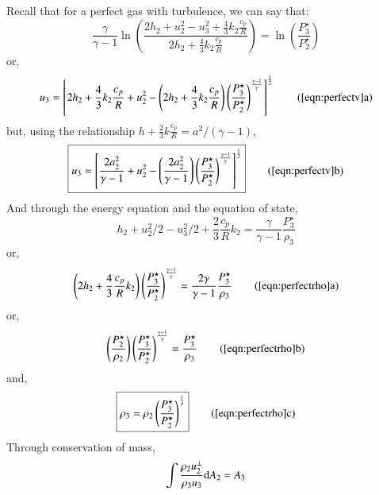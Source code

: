 \documentclass{warpdoc}
\numberwithin{equation}{section}
\newcommand{\Cp}{{c_{p}}}
\newcommand{\mfd}{\displaystyle}
\newcommand{\ordi}{{\rm d}}
\newcommand\frameeqn[1]{\fbox{$#1$}}
\begin{document}
Recall that for a perfect gas with turbulence, we can say that:
%
\begin{equation}
\frac{\gamma}{\gamma-1} \ln \left( \frac{2 h_2+u_2^2-u_3^2+\frac{4}{3}k_2 \frac{\Cp}{R}}
                                 {2 h_2+\frac{4}{3}k_2 \frac{\Cp}{R}} \right)
  =  \ln \left(\frac{P_3^\star}{P_2^\star}\right)
\label{eqn:perfectv}
\end{equation}
%
or,
%
\begin{equation}
   \mfd u_3
  = \left[ 2 h_2+\frac{4}{3}k_2 \frac{\Cp}{R}+u_2^2
   -\left( 2 h_2 +\frac{4}{3}k_2 \frac{\Cp}{R} \right)
      \left(\frac{P_3^\star}{P_2^\star}\right)^\frac{\gamma-1}{\gamma}
    \right]^\frac{1}{2}
  \tag{\ref{eqn:perfectv}a}
  \label{eqn:perfectv-2}
\end{equation}
%
but, using the relationship $h+\frac{2}{3}k\frac{\Cp}{R}=a^2/(\gamma-1)$,
%
\begin{equation}
 \frameeqn{
   \mfd u_3
  = \left[ \frac{2 a_2^2}{\gamma-1}+u_2^2
   -\left( \frac{2 a_2^2}{\gamma-1} \right)
      \left(\frac{P_3^\star}{P_2^\star}\right)^\frac{\gamma-1}{\gamma}
    \right]^\frac{1}{2}
 }
  \tag{\ref{eqn:perfectv}b}
  \label{eqn:perfectv-final}
\end{equation}
%
And through the energy equation and the equation of state,
%
\begin{equation}
   h_2+u_2^2/2-u_3^2/2 +\frac{2}{3}\frac{\Cp}{R} k_2
 = \frac{\gamma}{\gamma-1} \frac{P_3^\star}{\rho_3}
  \label{eqn:perfectrho}
\end{equation}
%
or,
%
\begin{equation}
   \left( 2 h_2 +\frac{4}{3}\frac{\Cp}{R} k_2 \right) 
   \left( \frac{P_3^\star}{P_2^\star}\right)^{\frac{\gamma-1}{\gamma}}
 = \frac{2 \gamma}{\gamma-1} \frac{P_3^\star}{\rho_3}
  \tag{\ref{eqn:perfectrho}a}
\end{equation}
%
or,
%
\begin{equation}
   \left(  \frac{P^\star_2}{\rho_2} \right)
   \left( \frac{P_3^\star}{P_2^\star}\right)^{\frac{\gamma-1}{\gamma}}
 =  \frac{P_3^\star}{\rho_3}
  \tag{\ref{eqn:perfectrho}b}
\end{equation}
%
and,
%
\begin{equation}
 \frameeqn{\rho_3 = \rho_2 \left( \mfd \frac{P_3^\star}{P_2^\star} \right)^\frac{1}{\gamma}}
  \tag{\ref{eqn:perfectrho}c}
  \label{eqn:perfectrho-final}
\end{equation}
%
Through conservation of mass,
%
\begin{equation}
  \int \frac{\rho_2 u_2^\perp}{\rho_3 u_3} \ordi A_2 = A_3
  \label{eqn:perfectP3}
\end{equation}
\end{document}
